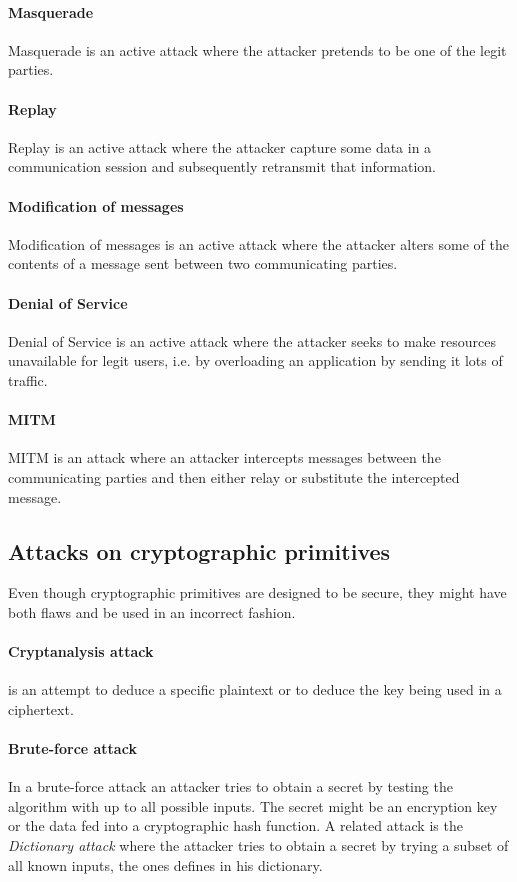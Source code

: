 \documentclass[pdftex,english,10pt,b5paper,twoside]{book}
\begin{document}
\paragraph{Masquerade} Masquerade is an active attack where the attacker pretends to be
one of the legit parties.

\paragraph{Replay} Replay is an active attack where the attacker capture some data in
a communication session and subsequently retransmit that information.

\paragraph{Modification of messages} Modification of messages is an active attack where the attacker
alters some of the contents of a message sent between two communicating
parties.

\paragraph{Denial of Service} Denial of Service is an active attack where the attacker seeks to
make resources unavailable for legit users, i.e. by overloading an application
by sending it lots of traffic.

\paragraph{\acl{MITM}} \ac{MITM} is an attack where an attacker intercepts messages
between the communicating parties and then either relay or substitute the
intercepted message.

\subsection{Attacks on cryptographic primitives}
Even though cryptographic primitives are designed to be secure, they might have
both flaws and be used in an incorrect fashion.

\paragraph{Cryptanalysis attack} is an attempt to deduce a specific plaintext
or to deduce the key being used in a ciphertext.

\paragraph{Brute-force attack} In a brute-force attack an attacker tries
to obtain a secret by testing the algorithm with up to all possible inputs. The
secret might be an encryption key or the data fed into a cryptographic hash
function. A related attack is the \emph{Dictionary attack} where the attacker
tries to obtain a secret by trying a subset of all known inputs, the ones
defines in his dictionary.  
\end{document}
